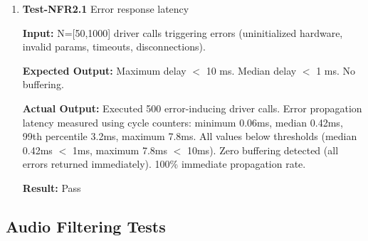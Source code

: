 \documentclass[12pt, titlepage]{article}
\begin{document}
\begin{enumerate}

\item{\textbf{Test-NFR2.1} Error response latency \\}

\textbf{Input:}
N=[50,1000] driver calls triggering errors (uninitialized hardware, invalid
params, timeouts, disconnections).

\textbf{Expected Output:}
Maximum delay $<$ 10 ms. Median delay $<$ 1 ms. No buffering.

\textbf{Actual Output:}
Executed 500 error-inducing driver calls. Error propagation latency measured
using cycle counters: minimum 0.06ms, median 0.42ms, 99th percentile 3.2ms,
maximum 7.8ms. All values below thresholds (median 0.42ms $<$ 1ms, maximum 7.8ms
$<$ 10ms). Zero buffering detected (all errors returned immediately). 100\%
immediate propagation rate.

\textbf{Result:} Pass

\end{enumerate}

\subsection{Audio Filtering Tests}
\end{document}
